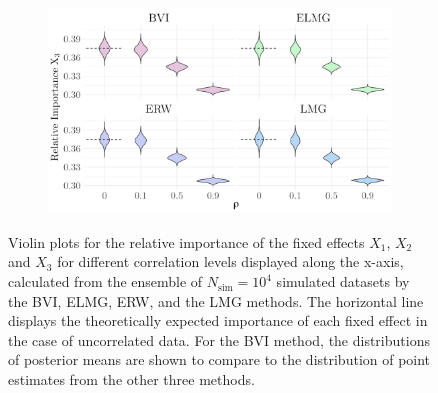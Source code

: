 \begin{figure}[H]
  \begin{subfigure}[b]{0.75\linewidth}
    \centering
    \includegraphics[width=\linewidth]{Figures/ViolinPlots/Variance_V3.png}
    \label{fig:relimp_X3_fig}
  \end{subfigure}
  
  \caption[Relative importance of the fixed effects in Gaussian LMM]{Violin plots for the relative importance of the fixed effects $X_1$, $X_2$ and $X_3$ for different correlation levels displayed along the x-axis, calculated from the ensemble of $N_{\text{sim}}=10^4$ simulated datasets by the BVI, ELMG, ERW, and the LMG methods. The horizontal line displays the theoretically expected importance of each fixed effect in the case of uncorrelated data. For the BVI method, the distributions of posterior means are shown to compare to the distribution of point estimates from the other three methods.}
  \label{fig:relimp_all}
\end{figure}


